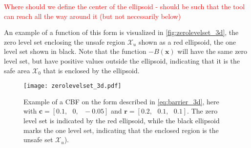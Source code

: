\textcolor{red}{Where should we define the center of the ellipsoid - should be such that the tool can reach all the way around it (but not necessarily below)}

An example of a function of this form is visualized in \autoref{fig:zerolevelset_3d}, the zero level set enclosing the unsafe region $\mathcal{X}_u$ shown as a red ellipsoid, the one level set shown in black. Note that the function $-B(\mathbf{x})$ will have the same zero level set, but have positive values outside the ellipsoid, indicating that it is the safe area $\mathcal{X}_0$ that is enclosed by the ellipsoid.

\begin{figure}[htbp]
	\centering
	\hspace*{-15mm}
	\texttt{[image: zerolevelset\_3d.pdf]}
	\caption{Example of a CBF on the form described in \autoref{eq:barrier_3d}, here with $\mathbf{c}= [0.1,\,\,\,\, 0,\,\,\,\, -0.05]$ and $\mathbf{r}=[0.2,\,\,\,\, 0.1,\,\,\,\, 0.1]$. The zero level set is indicated by the red ellipsoid, while the black ellipsoid marks the one level set, indicating that the enclosed  region is the unsafe set $\mathcal{X}_u$).}
	\label{fig:zerolevelset_3d}
\end{figure}

